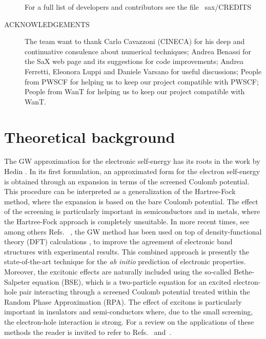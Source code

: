 \documentclass[11pt]{article}
\begin{document}
\begin{description}
For a full list of developers and contributors see the file ~sax/CREDITS


\item[ACKNOWLEDGEMENTS] The \SAX team want to thank
Carlo Cavazzoni (CINECA) for his deep and continuative
consulence about numerical techniques; Andrea Benassi for the SaX web page and its suggestions for code improvements;
Andrea Ferretti, Eleonora Luppi and Daniele Varsano for useful discussions;
People from PWSCF for helping us to keep our project compatible with PWSCF;
People from WanT for helping us to keep our project compatible with WanT.

\end{description}
\newpage

\tableofcontents

\clearpage
\section{Theoretical background}
The GW approximation for the electronic self-energy
 has its roots in the work by Hedin
\cite{hedi65pr,hedi-lund69ssp}.
In its first formulation, an approximated form for the electron
self-energy is obtained through an expansion in terms of
the screened Coulomb potential.
This procedure can be interpreted as a generalization of
the Hartree-Fock method, where the expansion is based on the
bare Coulomb potential.
The effect of the screening is particularly important in semiconductors
and in metals, where the Hartree-Fock approach is completely unsuitable.
In more recent times, see among others Refs.~%
\cite{hybe-loui84prb,hybe-loui85prl,godb+88prb,fari+88prb,%
enge+91prb,shir-mart93prb,roja+95prl,rohl+95prb},
the GW method has been used on top of
density-functional theory (DFT) calculations \cite{hohe-kohn64pr,kohn-sham65pr},
to improve the agreement of electronic band structures with experimental results.
This combined approach is presently
the state-of-the-art technique for the \emph{ab initio}
prediction of electronic properties.
Moreover, the excitonic effects are naturally included
using the so-called Bethe-Salpeter equation (BSE), which is a two-particle
equation for an excited electron-hole pair interacting through a screened Coulomb potential treated within the
Random Phase Approximation (RPA).
The effect of excitons is particularly important in insulators and semi-conductors where, due to the small screening,
the electron-hole interaction is strong.
For a review on the applications of these methods
the reader is invited to refer to Refs.~\cite{arya-gunn98rpp}
and~\cite{onid+02rmp}.
\end{document}
